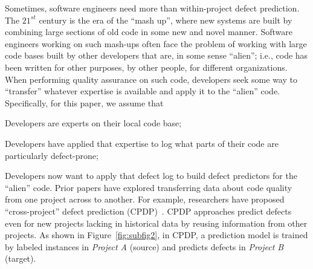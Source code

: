 Sometimes, software engineers
need more than within-project defect prediction.
The $21^{\mathit{st}}$ century is the era of the ``mash up'',
where new systems are built by combining large sections of old
code in some new and novel manner.
Software engineers working on such mash-ups often face
the problem of working with large code bases built by other developers that are, in some sense ``alien''; i.e.,
code has been written for other purposes,
by other people, for different organizations.  When performing
quality assurance on such code, developers
seek some way to ``transfer'' whatever expertise is
available and apply it to the ``alien'' code.
Specifically, for this
paper, we assume that
\squishlist
\item
Developers are experts on their local code base;
\item
Developers have applied that expertise to log what parts
of their code are particularly defect-prone;
\item
Developers now want to apply that defect log to
build defect predictors for the ``alien'' code.
\squishend
Prior papers have explored transferring data
about code quality from one project across to another.
For example, researchers
have proposed ``cross-project'' defect
prediction (CPDP)~\cite{He12, Ma12, Nam13, Rahman12, Turhan09, Zimmermann09}.
CPDP approaches predict defects even for new projects lacking
in historical data by reusing information from other projects. As shown in Figure~\ref{fig:subfig2}, in CPDP,
a prediction model is trained by
labeled instances in {\em Project A} (source) and predicts defects in {\em Project B} (target).

%

